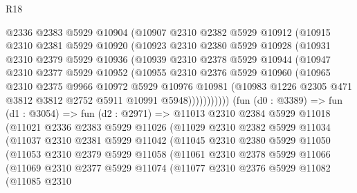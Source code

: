 \begin{lexlean}{R18}
\begin{coremodule}
            @2336
            @2383
            @5929
            @10904
            (@10907
              @2310
              @2382
              @5929
              @10912
              (@10915
                @2310
                @2381
                @5929
                @10920
                (@10923
                  @2310
                  @2380
                  @5929
                  @10928
                  (@10931
                    @2310
                    @2379
                    @5929
                    @10936
                    (@10939
                      @2310
                      @2378
                      @5929
                      @10944
                      (@10947
                        @2310
                        @2377
                        @5929
                        @10952
                        (@10955
                          @2310
                          @2376
                          @5929
                          @10960
                          (@10965
                            @2310
                            @2375
                            @9966
                            @10972
                            @5929
                            @10976
                            @10981
                            (@10983 @1226 @2305 @471 @3812 @3812 @2752 @5911 @10991 @5948)))))))))))
        (fun (d0 : @3389) =>
        fun (d1 : @3054) =>
        fun (d2 : @2971) =>
        @11013
          @2310
          @2384
          @5929
          @11018
          (@11021
            @2336
            @2383
            @5929
            @11026
            (@11029
              @2310
              @2382
              @5929
              @11034
              (@11037
                @2310
                @2381
                @5929
                @11042
                (@11045
                  @2310
                  @2380
                  @5929
                  @11050
                  (@11053
                    @2310
                    @2379
                    @5929
                    @11058
                    (@11061
                      @2310
                      @2378
                      @5929
                      @11066
                      (@11069
                        @2310
                        @2377
                        @5929
                        @11074
                        (@11077
                          @2310
                          @2376
                          @5929
                          @11082
                          (@11085
                            @2310

\end{coremodule}
\end{lexlean}
